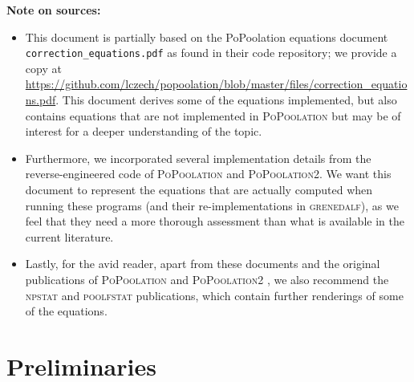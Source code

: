\documentclass[letterpaper,fontsize=9pt,DIV=12]{scrartcl}
\newcounter{todo}
\newcommand\todo[1]{}
\newcommand\citeay[1]{\citeauthor{#1} (\citeyear{#1}) \cite{#1}}
\newcommand\toolname{\textsc}
\begin{document}
\pagebreak

\tableofcontents

\vspace*{5em}
\textbf{Note on sources:}
\begin{itemize}
    \item This document is partially based on the PoPoolation equations document \texttt{correction\_equations.pdf} as found in their code repository; we provide a copy at \url{https://github.com/lczech/popoolation/blob/master/files/correction_equations.pdf}. This document derives some of the equations implemented, but also contains equations that are not implemented in \toolname{PoPoolation} but may be of interest for a deeper understanding of the topic.
    \item Furthermore, we incorporated several implementation details from the reverse-engineered code of \toolname{PoPoolation} and \toolname{PoPoolation2}. We want this document to represent the equations that are actually computed when running these programs (and their re-implementations in \toolname{grenedalf}), as we feel that they need a more thorough assessment than what is available in the current literature.
    \item Lastly, for the avid reader, apart from these documents and the original publications of \toolname{PoPoolation} \cite{Kofler2011a} and \toolname{PoPoolation2} \cite{Kofler2011b}, we also recommend the \toolname{npstat} \cite{Ferretti2013} and \toolname{poolfstat} \cite{Hivert2018,Gautier2022-zd} publications, which contain further renderings of some of the equations.
\end{itemize}

\pagebreak


\section{Preliminaries}
\label{supp:sec:Definitions}


\end{document}
